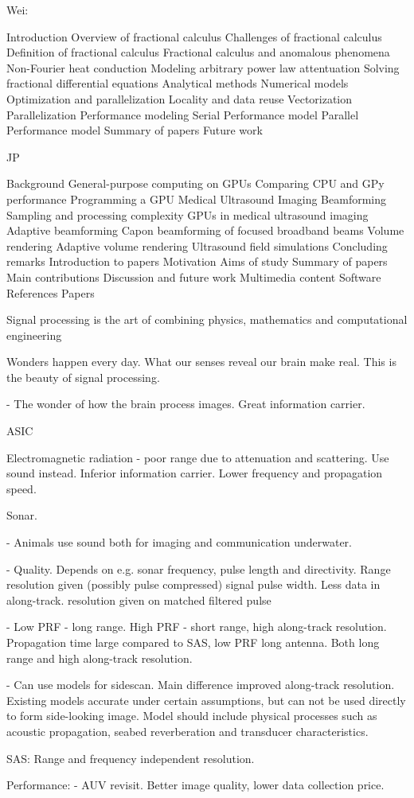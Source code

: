 Wei:

Introduction
   Overview of fractional calculus
   Challenges of fractional calculus
   Definition of fractional calculus
   Fractional calculus and anomalous phenomena
      Non-Fourier heat conduction
      Modeling arbitrary power law attentuation
   Solving fractional differential equations
      Analytical methods
      Numerical models
   Optimization and parallelization
      Locality and data reuse
      Vectorization
      Parallelization
   Performance modeling
      Serial Performance model
      Parallel Performance model
Summary of papers
Future work
   
   
JP

Background
   General-purpose computing on GPUs
      Comparing CPU and GPy performance
      Programming a GPU
   Medical Ultrasound Imaging
      Beamforming
      Sampling and processing complexity
      GPUs in medical ultrasound imaging
      Adaptive beamforming
      Capon beamforming of focused broadband beams
   Volume rendering
      Adaptive volume rendering
   Ultrasound field simulations
   Concluding remarks
Introduction to papers
   Motivation
   Aims of study
   Summary of papers
   Main contributions
   Discussion and future work
   Multimedia content
   Software
References
Papers


Signal processing is the art of combining physics, mathematics and computational engineering 

Wonders happen every day. What our senses reveal our brain make real. This is the beauty of signal processing.

- The wonder of how the brain process images. Great information carrier.

\gls{ASIC}

Electromagnetic radiation - poor range due to attenuation and scattering. Use sound instead. Inferior information carrier. Lower frequency and propagation speed.

Sonar. 

- Animals use sound both for imaging and communication underwater.

- Quality. Depends on e.g. sonar frequency, pulse length and directivity. Range resolution given (possibly pulse compressed) signal pulse width. Less data in along-track. resolution given on matched filtered pulse 

- Low PRF - long range. High PRF - short range, high along-track resolution. Propagation time large compared to  SAS, low PRF long antenna. Both long range and high along-track resolution.

- Can use models for sidescan. Main difference improved along-track resolution. Existing models accurate under certain assumptions, but can not be used directly to form side-looking image. Model should include physical processes such as acoustic propagation, seabed reverberation and transducer characteristics.

SAS: Range and frequency independent resolution.


Performance:
- AUV revisit. Better image quality, lower data collection price.

